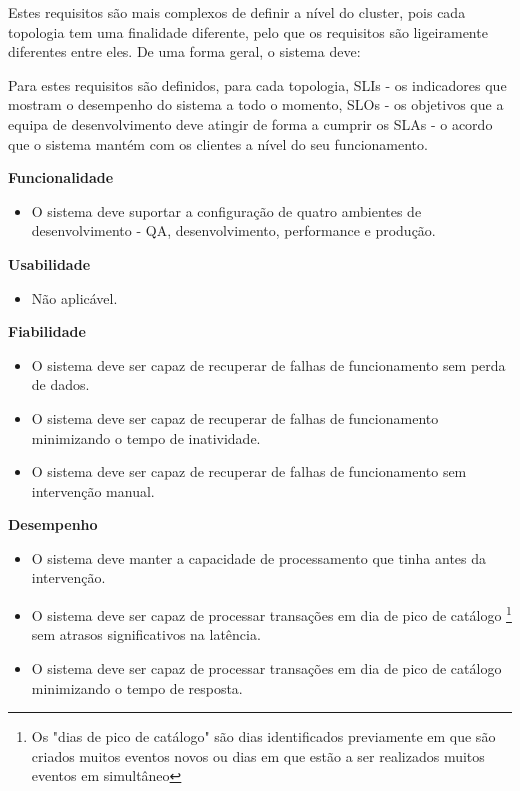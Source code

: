 Estes requisitos são mais complexos de definir a nível do \gls{cluster}, pois cada topologia tem 
uma finalidade diferente, pelo que os requisitos são ligeiramente diferentes entre eles. De uma
forma geral, o sistema deve:

Para estes requisitos são definidos, para cada topologia, \acp{SLI} - os indicadores que mostram o
desempenho do sistema a todo o momento, \acp{SLO} - os objetivos que a equipa de desenvolvimento
deve atingir de forma a cumprir os \acp{SLA} - o acordo que o sistema mantém com os clientes a 
nível do seu funcionamento.

\vspace{5mm}

\textbf{Funcionalidade}
\begin{itemize}
  \item O sistema deve suportar a configuração de quatro ambientes de desenvolvimento - \ac{QA}, 
    desenvolvimento, performance e produção.
\end{itemize}

\textbf{Usabilidade}
\begin{itemize}
  \item Não aplicável.
\end{itemize}

\textbf{Fiabilidade}

\begin{itemize}
  \item O sistema deve ser capaz de recuperar de falhas de funcionamento sem perda de dados.
  \item O sistema deve ser capaz de recuperar de falhas de funcionamento minimizando o tempo de inatividade.
  \item O sistema deve ser capaz de recuperar de falhas de funcionamento sem intervenção manual.
\end{itemize}

\textbf{Desempenho}
\begin{itemize}
  \item O sistema deve manter a capacidade de processamento que tinha antes da intervenção.
  \item O sistema deve ser capaz de processar transações em dia de pico de catálogo \footnote[1]{
    Os "dias de pico de catálogo" são dias identificados previamente em que são criados muitos 
    eventos novos ou dias em que estão a ser realizados muitos eventos em simultâneo}
    sem atrasos significativos na latência.
  \item O sistema deve ser capaz de processar transações em dia de pico de catálogo \footnotemark[1] minimizando o 
    tempo de resposta.
\end{itemize}

